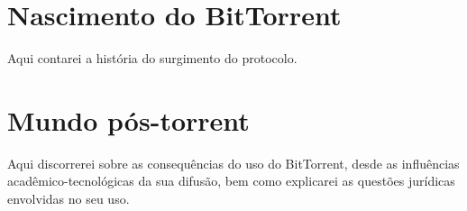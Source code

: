 \section{Nascimento do BitTorrent}

Aqui contarei a história do surgimento do protocolo.

\section{Mundo pós-torrent}

Aqui discorrerei sobre as consequências do uso do BitTorrent, desde as influências acadêmico-tecnológicas da sua difusão, bem como explicarei as questões jurídicas envolvidas no seu uso.

\clearpage
